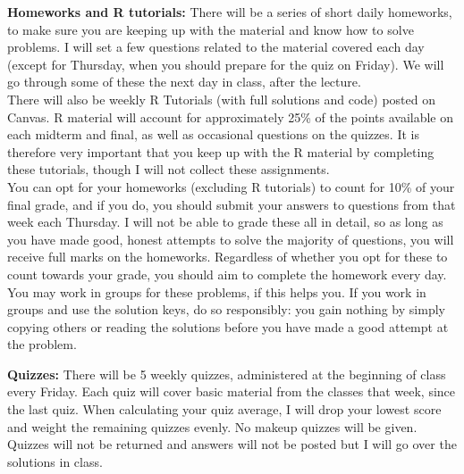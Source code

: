 \documentclass[11pt, letterpaper]{article}
\begin{document}
\medskip

\noindent \textbf{Homeworks and R tutorials:} There will be a series of short daily homeworks, to make sure
you are keeping up with the material and know how to solve problems. I will set a few questions
related to the material covered each day (except for Thursday, when you should prepare for the
quiz on Friday). We will go through some of these the next day in class, after the lecture.\\ %
\indent There will also be weekly R Tutorials (with full solutions and code) posted on Canvas. R material will account for approximately 25\% of the points available on each midterm and final, as well
as occasional questions on the quizzes. It is therefore very important that you keep up with the R material by completing these tutorials, though I will not collect these assignments.\\
\indent You can opt for your homeworks (excluding R tutorials) to count for 10\% of your final grade,
and if you do, you should submit your answers to questions from that week each Thursday. I will
not be able to grade these all in detail, so as long as you have made good, honest attempts to solve
the majority of questions, you will receive full marks on the homeworks. Regardless of whether you
opt for these to count towards your grade, you should aim to complete the homework every day.
You may work in groups for these problems, if this helps you. If you work in groups and use the solution keys, do so responsibly: you gain nothing by simply
copying others or reading the solutions before you have made a good attempt at the problem.\\

\medskip



\noindent \textbf{Quizzes:} There will be 5 weekly quizzes, administered at the beginning of class every Friday. Each
quiz will cover basic material from the classes that week, since the last quiz. When calculating your
quiz average, I will drop your lowest score and weight the remaining quizzes evenly. No makeup
quizzes will be given. Quizzes will not be returned and answers will not be posted but I will go
over the solutions in class.

\medskip
\end{document}
